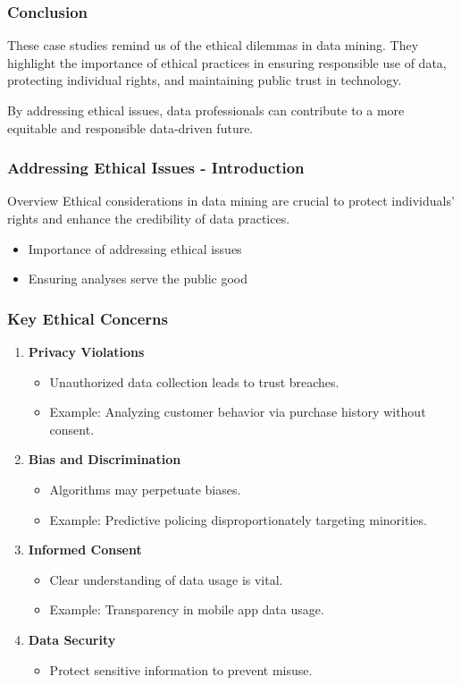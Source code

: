 \documentclass[aspectratio=169]{beamer}
\begin{document}
\begin{frame}[fragile]
    \frametitle{Conclusion}
    These case studies remind us of the ethical dilemmas in data mining. They highlight the importance of ethical practices in ensuring responsible use of data, protecting individual rights, and maintaining public trust in technology.

    By addressing ethical issues, data professionals can contribute to a more equitable and responsible data-driven future.
\end{frame}

\begin{frame}[fragile]
    \frametitle{Addressing Ethical Issues - Introduction}
    \begin{block}{Overview}
        Ethical considerations in data mining are crucial to protect individuals' rights and enhance the credibility of data practices.
    \end{block}
    \begin{itemize}
        \item Importance of addressing ethical issues
        \item Ensuring analyses serve the public good
    \end{itemize}
\end{frame}

\begin{frame}[fragile]
    \frametitle{Key Ethical Concerns}
    \begin{enumerate}
        \item \textbf{Privacy Violations}
            \begin{itemize}
                \item Unauthorized data collection leads to trust breaches.
                \item Example: Analyzing customer behavior via purchase history without consent.
            \end{itemize}
        \item \textbf{Bias and Discrimination}
            \begin{itemize}
                \item Algorithms may perpetuate biases.
                \item Example: Predictive policing disproportionately targeting minorities.
            \end{itemize}
        \item \textbf{Informed Consent}
            \begin{itemize}
                \item Clear understanding of data usage is vital.
                \item Example: Transparency in mobile app data usage.
            \end{itemize}
        \item \textbf{Data Security}
            \begin{itemize}
                \item Protect sensitive information to prevent misuse.
            \end{itemize}
    \end{enumerate}
\end{frame}
\end{document}
